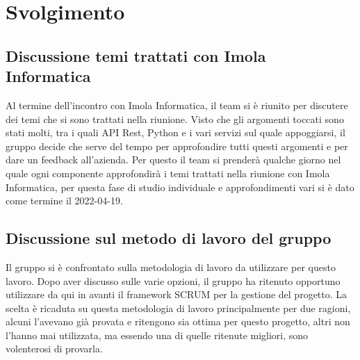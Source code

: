 \section{Svolgimento}
\subsection{Discussione temi trattati con Imola Informatica}
Al termine dell'incontro con Imola Informatica, il team si è riunito per discutere dei temi che si sono trattati nella riunione. Visto che gli argomenti toccati sono stati molti, tra i quali API Rest, Python e i vari servizi sul quale appoggiarsi, il gruppo decide che serve del tempo per approfondire tutti questi argomenti e per dare un feedback all'azienda. Per questo il team si prenderà qualche giorno nel quale ogni componente approfondirà i temi trattati nella riunione con Imola Informatica, per questa fase di studio individuale e approfondimenti vari si è dato come termine il 2022-04-19.
\subsection{Discussione sul metodo di lavoro del gruppo}
Il gruppo si è confrontato sulla metodologia di lavoro da utilizzare per questo lavoro. Dopo aver discusso sulle varie opzioni, il gruppo ha ritenuto opportuno utilizzare da qui in avanti il framework SCRUM per la gestione del progetto. La scelta è ricaduta su questa metodologia di lavoro principalmente per due ragioni, alcuni l'avevano già provata e ritengono sia ottima per questo progetto, altri non l'hanno mai utilizzata, ma essendo una di quelle ritenute migliori, sono volenterosi di provarla.

